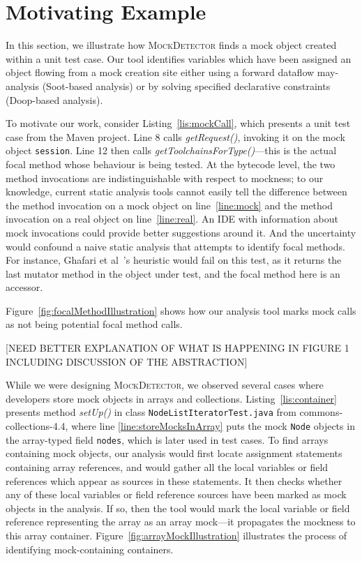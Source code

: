 \section{Motivating Example}
\label{sec:motivating-example}

In this section, we illustrate how \textsc{MockDetector} finds a mock object created within a unit test case. Our tool identifies variables which have been assigned an object flowing from a mock creation site either using a forward dataflow may-analysis (Soot-based analysis) or by solving specified declarative constraints (Doop-based analysis).


To motivate our work, consider Listing~\ref{lis:mockCall}, which presents a unit test case from the Maven project. Line 8 calls \textit{getRequest()}, invoking it on the mock object \texttt{session}. Line 12 then calls \textit{getToolchainsForType()}---this is the actual focal method whose behaviour is being tested. At the bytecode level, the two method invocations are indistinguishable with respect to mockness; to our knowledge, current static analysis tools cannot easily tell the difference between the method invocation on a mock object on line~\ref{line:mock} and the method invocation on a real object on line~\ref{line:real}. An IDE with information about mock invocations could provide better suggestions around it. And the uncertainty would confound a naive static analysis that attempts to identify focal methods. For instance, Ghafari et al~\cite{ghafari15:_autom}'s heuristic would fail on this test, as it returns the last mutator method in the object under test, and the focal method here is an accessor. 

Figure~\ref{fig:focalMethodIllustration} shows how our analysis tool marks mock calls as not being potential focal method calls.

[NEED BETTER EXPLANATION OF WHAT IS HAPPENING IN FIGURE 1 INCLUDING DISCUSSION OF THE ABSTRACTION]

While we were designing \textsc{MockDetector}, we observed several cases where developers store mock objects in arrays and collections. Listing~\ref{lis:container} presents method \textit{setUp()} in class \texttt{NodeListIteratorTest.java} from commons-collections-4.4, where line \ref{line:storeMocksInArray} puts the mock \texttt{Node} objects in the array-typed field \texttt{nodes}, which is later used in test cases. To find arrays containing mock objects, our analysis would first locate assignment statements containing array references, and would gather all the local variables or field references which appear as sources in these statements. It then checks whether any of these local variables or field reference sources have been marked as mock objects in the analysis. If so, then the tool would mark the local variable or field reference representing the array as an array mock---it propagates the mockness to this array container. Figure~\ref{fig:arrayMockIllustration} illustrates the process of identifying mock-containing containers.

